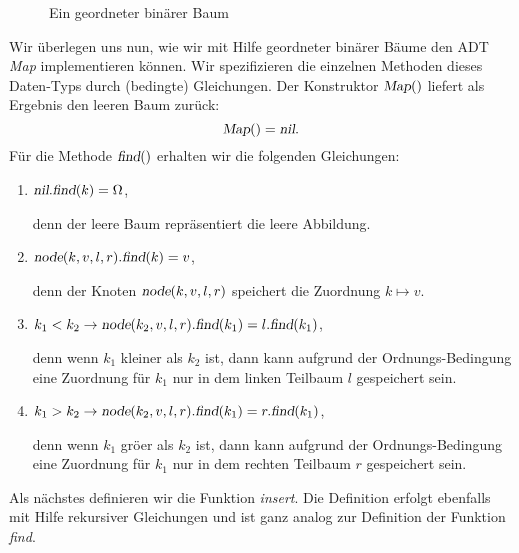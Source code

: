 \begin{figure}[!ht]
  \centering
  \caption{Ein geordneter bin\"arer Baum}
  \label{fig:graph1}
\end{figure}


Wir \"uberlegen uns nun, wie wir mit Hilfe geordneter bin\"arer B\"aume den ADT \textsl{Map}
implementieren k\"onnen.  Wir spezifizieren die einzelnen Methoden dieses Daten-Typs durch
(bedingte) Gleichungen.  Der Konstruktor $\textsl{Map}()$ liefert als Ergebnis den leeren Baum zur\"uck:
\[ \textsl{Map}() = \textsl{nil}. \]
F\"ur die Methode $\textsl{find}()$ erhalten wir die folgenden Gleichungen:
\begin{enumerate}
\item $\textsl{nil}\mathtt{.}\textsl{find}(k) = \Omega$,

      denn der leere Baum repr\"asentiert die leere Abbildung.
\item $\textsl{node}(k, v, l, r)\mathtt{.}\textsl{find}(k) = v$,

      denn der Knoten $\textsl{node}(k,v,l,r)$ speichert die Zuordnung $k \mapsto v$.
\item $k_1 < k_2 \rightarrow \textsl{node}(k_2, v, l, r)\mathtt{.}\textsl{find}( k_1) = l\mathtt{.}\textsl{find}(k_1)$,

      denn wenn $k_1$ kleiner als $k_2$ ist, dann kann aufgrund der Ordnungs-Bedingung
      eine Zuordnung f\"ur $k_1$ nur in dem linken Teilbaum $l$ gespeichert sein.
\item $k_1 > k_2 \rightarrow \textsl{node}(k_2, v, l, r)\mathtt{.}\textsl{find}( k_1 ) = r\mathtt{.}\textsl{find}(k_1)$,

      denn wenn $k_1$ gr\"o\3er als $k_2$ ist, dann kann aufgrund der Ordnungs-Bedingung
      eine Zuordnung f\"ur $k_1$ nur in dem rechten Teilbaum $r$ gespeichert sein.
\end{enumerate}
Als n\"achstes definieren wir die Funktion \textsl{insert}.  Die Definition erfolgt
ebenfalls mit Hilfe rekursiver Gleichungen und ist ganz analog zur Definition der 
Funktion \textsl{find}.

